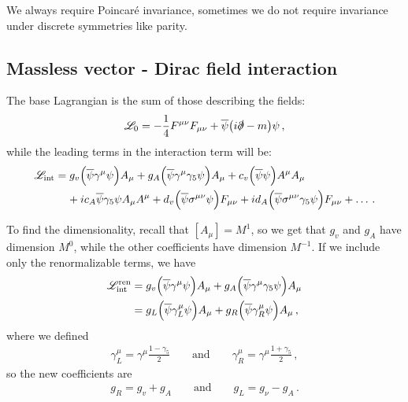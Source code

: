 \documentclass[main.tex]{subfiles}
\begin{document}
We always require Poincaré invariance, sometimes we do not require invariance under discrete symmetries like parity. 

\subsection{Massless vector - Dirac field interaction}

The base Lagrangian is the sum of those describing the fields: 
%
\begin{align}
\mathscr{L}_{0}
= - \frac{1}{4} F^{\mu \nu } F_{\mu \nu }
+ \overline{\psi} \qty(i \slashed{\partial} - m ) \psi 
\,,
\end{align}
%
while the leading terms in the interaction term will be: 
%
\begin{align}
\begin{split}
\mathscr{L} _{\text{int}}
&= g_{v } \qty(\overline{\psi} \gamma^{\mu } \psi ) A_{\mu }
+ g_{A} \qty(\overline{\psi} \gamma^{\mu } \gamma_{5} \psi )A_{\mu }
+ c_{v } \qty(\overline{\psi} \psi ) A^{\mu } A_{\mu } 
\\
&\phantom{=}\ 
+ i c_A \overline{\psi} \gamma_{5} \psi A_{\mu }A^{\mu }
+ d_{v } \qty(\overline{\psi} \sigma^{\mu \nu }\psi )F_{\mu \nu }
+ i d_A  \qty(\overline{\psi} \sigma^{\mu \nu } \gamma_5 \psi) F_{\mu\nu  } + \dots
\,.
\end{split}
\end{align}

To find the dimensionality, recall that \([A_{\mu }] = M^{1}\), so we get that \(g_v \) and \(g_A\) have dimension \(M^{0}\), while the other coefficients have dimension \(M^{-1}\). 
If we include only the renormalizable terms, we have 
%
\begin{align}
\mathscr{L} _{\text{int}}^{\text{ren}}
&= g_{v } \qty(\overline{\psi} \gamma^{\mu } \psi ) A_{\mu }
+ g_{A} \qty(\overline{\psi} \gamma^{\mu } \gamma_{5} \psi )A_{\mu }  \\
&= g_{L } \qty(\overline{\psi} \gamma^{\mu }_{L} \psi ) A_{\mu }+
 g_{R } \qty(\overline{\psi} \gamma^{\mu }_{R} \psi ) A_{\mu }
\,,
\end{align}
%
where we defined 
%
\begin{align}
\gamma^{\mu }_{L} = \gamma^{\mu } \frac{1 - \gamma_5 }{2} 
\qquad \text{and} \qquad
\gamma^{\mu }_{R} = \gamma^{\mu } \frac{1 + \gamma_5 }{2} 
\,,
\end{align}
%
so the new coefficients are 
%
\begin{align}
g_R = g_{v } + g_A \qquad \text{and} \qquad
g_L = g_{\nu } - g_A
\,.
\end{align}
\end{document}
